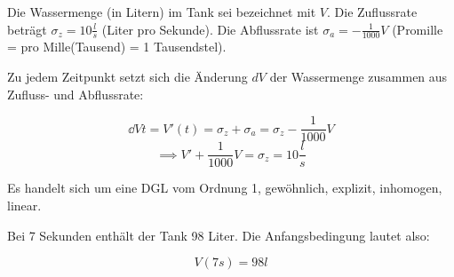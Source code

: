 \item

Die Wassermenge (in Litern) im Tank sei bezeichnet mit $V$. Die Zuflussrate beträgt $\sigma_z = 10 \frac{l}{s}$ (Liter pro Sekunde). Die Abflussrate ist $\sigma_a = -\frac{1}{1000} V$ (Promille = pro Mille(Tausend) = 1 Tausendstel).

Zu jedem Zeitpunkt setzt sich die Änderung $dV$ der Wassermenge zusammen aus Zufluss- und Abflussrate:

$$\dd{V}{t} = V'(t) = \sigma_z + \sigma_a = \sigma_z - \frac{1}{1000}V$$
$$\implies V' + \frac{1}{1000} V = \sigma_z = 10 \frac{l}{s}$$

Es handelt sich um eine DGL vom Ordnung 1, gewöhnlich, explizit, inhomogen, linear.

Bei 7 Sekunden enthält der Tank 98 Liter. Die Anfangsbedingung lautet also:

$$V(7s) = 98l$$

